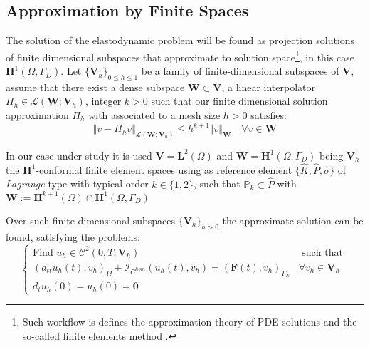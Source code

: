 \subsection{Approximation by Finite Spaces}
The solution of the elastodynamic problem will be found as projection solutions of finite dimensional subspaces that approximate to solution space\footnote{Such workflow is defines the approximation theory of PDE solutions and the so-called finite elements method \cite{ern2004theory}.}, in this case $\mathbf{H}^1(\Omega, \Gamma_D)$.
Let $\{\mathbf{V}_h \}_{0 \leq h \leq 1}$ be a family of finite-dimensional subspaces of $\mathbf{V}$, assume that there exist a dense subspace $\mathbf{W} \subset \mathbf{V}$, a linear interpolator $\Pi_h \in \mathcal{L}(\mathbf{W};\mathbf{V}_h)$, integer $k > 0$ such that our finite dimensional solution approximation $\Pi_{h} $ with associated to a mesh size $h>0$ satisfies:
\begin{equation*}
    \Vert v - \Pi_h v \Vert_{\mathcal{L}(\mathbf{W};\mathbf{V}_h)} \leq h^{k+1} \Vert v \Vert_{\mathbf{W}} \quad \forall v \in \mathbf{W}
\end{equation*}
\begin{rem}
In our case under study it is used $\mathbf{V} = \mathbf{L}^2(\Omega)$ and $\mathbf{W} = \mathbf{H}^1(\Omega, \Gamma_D)$ being $\mathbf{V}_h$ the $\mathbf{H}^1$-conformal finite element spaces using as reference element $\{ \hat{K}, \hat{P}, \hat{\sigma} \}$ of \textit{Lagrange} type with typical order $k \in \{1,2\}$, such that $\mathbb{P}_k \subset \hat{P}$ with $\mathbf{W} := \mathbf{H}^{k+1}(\Omega) \cap \mathbf{H}^1(\Omega, \Gamma_D)$
\end{rem}

Over such finite dimensional subspaces $\{ \mathbf{V}_h\}_{h>0}$ the approximate solution can be found, satisfying the problems:
\begin{equation}
\label{ODE-Discretized}
    \left \{
    \begin{array}{cc}
        \text{Find } u_h \in \mathcal{C}^2(0,T; \mathbf{V}_h) & \text{ such that } \\
        (d_{tt} u_h(t), v_h)_{\Omega} + \mathcal{I}_{C^{hom}}(u_h(t), v_h) = (\mathbf{F}(t), v_h)_{\Gamma_N} & \forall v_h \in \mathbf{V}_h\\
        d_t u_h(0) = u_h(0) = \mathbf{0} & 
    \end{array}
    \right. 
\end{equation}

